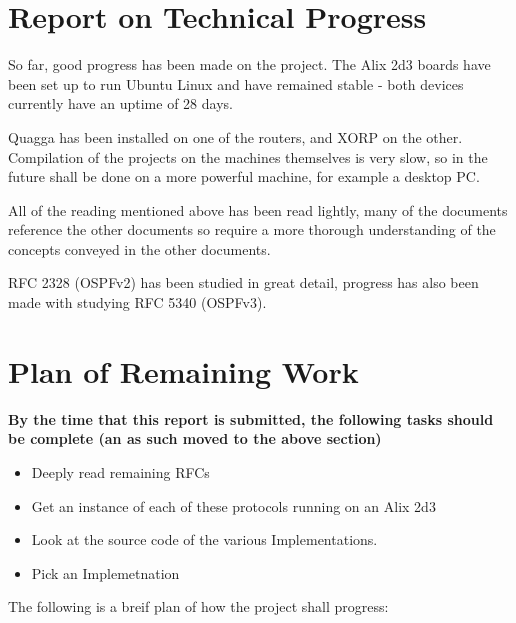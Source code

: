 \documentclass[12pt]{report}
\begin{document}
\chapter{Report on Technical Progress}

So far, good progress has been made on the project.  The Alix 2d3 boards have
been set up to run Ubuntu Linux and have remained stable - both devices
currently have an uptime of 28 days.

Quagga has been installed on one of the routers, and XORP on the other.
Compilation of the projects on the machines themselves is very slow, so in the
future shall be done on a more powerful machine, for example a desktop PC.

All of the reading mentioned above has been read lightly, many of the documents
reference the other documents so require a more thorough understanding of the
concepts conveyed in the other documents.

RFC 2328 (OSPFv2) has been studied in great detail, progress has also been made
with studying RFC 5340 (OSPFv3). 

\chapter{Plan of Remaining Work}

\em

\textbf{
	By the time that this report is submitted, the following tasks should be
	complete (an as such moved to the above section) 
}

\begin{itemize}

\item Deeply read remaining RFCs
\item Get an instance of each of these protocols running on an Alix 2d3
\item Look at the source code of the various Implementations. 
\item Pick an Implemetnation 

\end{itemize}

\em 

The following is a breif plan of how the project shall progress:
\end{document}
